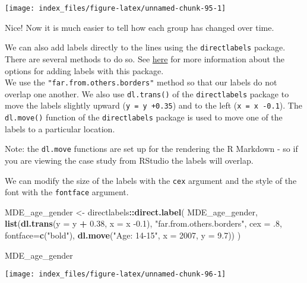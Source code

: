 \documentclass[
]{article}
\newenvironment{Shaded}{\begin{snugshade}}{\end{snugshade}}
\newcommand{\DataTypeTok}[1]{\textcolor[rgb]{0.13,0.29,0.53}{#1}}
\newcommand{\DecValTok}[1]{\textcolor[rgb]{0.00,0.00,0.81}{#1}}
\newcommand{\FloatTok}[1]{\textcolor[rgb]{0.00,0.00,0.81}{#1}}
\newcommand{\KeywordTok}[1]{\textcolor[rgb]{0.13,0.29,0.53}{\textbf{#1}}}
\newcommand{\NormalTok}[1]{#1}
\newcommand{\OperatorTok}[1]{\textcolor[rgb]{0.81,0.36,0.00}{\textbf{#1}}}
\newcommand{\StringTok}[1]{\textcolor[rgb]{0.31,0.60,0.02}{#1}}
\begin{document}
\begin{center}\texttt{[image: index\_files/figure-latex/unnamed-chunk-95-1]} \end{center}

Nice! Now it is much easier to tell how each group has changed over
time.

We can also add labels directly to the lines using the
\texttt{directlabels} package. There are several methods to do so. See
\href{http://directlabels.r-forge.r-project.org/docs/index.html}{here}
for more information about the options for adding labels with this
package.\\
We use the \texttt{"far.from.others.borders"} method so that our labels
do not overlap one another. We also use \texttt{dl.trans()} of the
\texttt{directlabels} package to move the labels slightly upward
(\texttt{y\ =\ y\ +0.35}) and to the left (\texttt{x\ =\ x\ -0.1}). The
\texttt{dl.move()} function of the \texttt{directlabels} package is used
to move one of the labels to a particular location.

Note: the \texttt{dl.move} functions are set up for the rendering the R
Markdown - so if you are viewing the case study from RStudio the labels
will overlap.

We can modify the size of the labels with the \texttt{cex} argument and
the style of the font with the \texttt{fontface} argument.

\begin{Shaded}
\begin{Highlighting}[]
\NormalTok{MDE_age_gender <-}\StringTok{ }\NormalTok{directlabels}\OperatorTok{::}\KeywordTok{direct.label}\NormalTok{(}
\NormalTok{  MDE_age_gender, }
  \KeywordTok{list}\NormalTok{(}\KeywordTok{dl.trans}\NormalTok{(}\DataTypeTok{y =}\NormalTok{ y }\OperatorTok{+}\StringTok{ }\FloatTok{0.38}\NormalTok{, }\DataTypeTok{x =}\NormalTok{ x }\FloatTok{-0.1}\NormalTok{), }
       \StringTok{"far.from.others.borders"}\NormalTok{,}
       \DataTypeTok{cex =} \FloatTok{.8}\NormalTok{, }
       \DataTypeTok{fontface=}\KeywordTok{c}\NormalTok{(}\StringTok{"bold"}\NormalTok{), }
       \KeywordTok{dl.move}\NormalTok{(}\StringTok{"Age: 14-15"}\NormalTok{, }\DataTypeTok{x =} \DecValTok{2007}\NormalTok{, }\DataTypeTok{y =} \FloatTok{9.7}\NormalTok{))}
\NormalTok{  )}

\NormalTok{MDE_age_gender }
\end{Highlighting}
\end{Shaded}

\begin{center}\texttt{[image: index\_files/figure-latex/unnamed-chunk-96-1]} \end{center}
\end{document}
